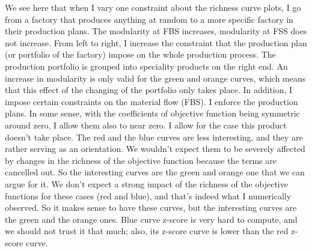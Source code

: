 {	We see here that when I vary one constraint about the richness curve plots, I go from a factory that produces anything at random to a more specific factory in their production plans. The modularity at FBS increases, modularity at FSS does not increase. From left to right, I increase the constraint that the production plan (or portfolio of the factory) impose on the whole production process. The production portfolio is grouped into speciality products on the right end. An increase in modularity is only valid for the green and orange curves, which means that this effect of the changing of the portfolio only takes place. In addition, I impose certain constraints on the material flow (FBS). I enforce the production plans. In some sense, with the coefficients of objective function being symmetric around zero, I allow them also to near zero. I allow for the case this product doesn't take place. The red and the blue curves are less interesting, and they are rather serving as an orientation. We wouldn't expect them to be severely affected by changes in the richness of the objective function because the terms are cancelled out. So the interesting curves are the green and orange one that we can argue for it. We don't expect a strong impact of the richness of the objective functions for these cases (red and blue), and that's indeed what I numerically observed. So it makes sense to have these curves, but the interesting curves are the green and the orange ones.
	Blue curve z-score is very hard to compute, and we should not trust it that much; also, its z-score curve is lower than the red z-score curve. 
}







